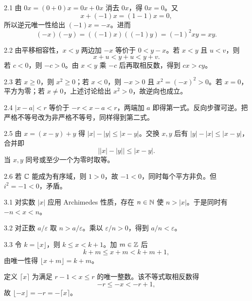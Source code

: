 \begin{solution}{2.1}
由 \(0x=(0+0)x=0x+0x\) 消去 \(0x\)，得 \(0x=0\)。又
\[
 x+(-1)x=(1-1)x=0,
\]
所以逆元唯一性给出 \((-1)x=-x\)。进而
\[
 (-x)(-y)=((-1)x)((-1)y)=(-1)^2xy=xy.
\]
\end{solution}

\begin{solution}{2.2}
由平移相容性，\(x<y\) 两边加 \(-x\) 等价于 \(0<y-x\)。若 \(x<y\) 且 \(u<v\)，则
\[
 x+u<y+u<y+v.
\]
若 \(c<0\)，则 \(-c>0\)。由 \(x<y\) 乘 \(-c\) 后再取相反数，得到 \(cx>cy\)。
\end{solution}

\begin{solution}{2.3}
若 \(x\ge0\)，则 \(x^2\ge0\)；若 \(x<0\)，则 \(-x>0\) 且 \(x^2=(-x)^2>0\)。若 \(x=0\)，平方为零；若 \(x\ne0\)，上述讨论给出 \(x^2>0\)，故逆向也成立。
\end{solution}

\begin{solution}{2.4}
\(|x-a|<r\) 等价于 \(-r<x-a<r\)，两端加 \(a\) 即得第一式。反向步骤可逆。把严格不等号改为非严格不等号，同样得到第二式。
\end{solution}

\begin{solution}{2.5}
由 \(x=(x-y)+y\) 得 \(|x|-|y|\le|x-y|\)。交换 \(x,y\) 后有 \(|y|-|x|\le|x-y|\)，合并即
\[
 \bigl||x|-|y|\bigr|\le|x-y|.
\]
当 \(x,y\) 同号或至少一个为零时取等。
\end{solution}

\begin{solution}{2.6}
若 \(\mathbb{C}\) 能成为有序域，则 \(1>0\)，故 \(-1<0\)，同时每个平方非负。但 \(i^2=-1<0\)，矛盾。
\end{solution}

\begin{solution}{3.1}
对实数 \(|x|\) 应用 Archimedes 性质，存在 \(n\in\mathbb{N}\) 使 \(n>|x|\)。于是同时有 \(-n<x<n\)。
\end{solution}

\begin{solution}{3.2}
对正数 \(a/\varepsilon\) 取 \(n>a/\varepsilon\)。乘以 \(\varepsilon/n>0\)，得到 \(a/n<\varepsilon\)。
\end{solution}

\begin{solution}{3.3}
令 \(k=\lfloor x\rfloor\)，则 \(k\le x<k+1\)。加 \(m\in\mathbb{Z}\) 后
\[
 k+m\le x+m<k+m+1,
\]
由唯一性得 \(\lfloor x+m\rfloor=k+m\)。

定义 \(\lceil x\rceil\) 为满足 \(r-1<x\le r\) 的唯一整数。该不等式取相反数得
\[
 -r\le -x<-r+1,
\]
故 \(\lfloor-x\rfloor=-r=-\lceil x\rceil\)。
\end{solution}

